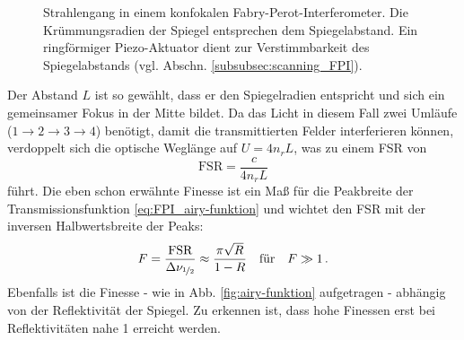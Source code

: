 \begin{figure}[h]
 	\centering
	\caption[FPI - konfokal]{Strahlengang in einem
	konfokalen Fabry-Perot-Interferometer. Die
	Krümmungsradien der Spiegel entsprechen dem
	Spiegelabstand. Ein ringförmiger Piezo-Aktuator dient zur
	Verstimmbarkeit des Spiegelabstands (vgl. Abschn.
	\ref{subsubsec:scanning_FPI}).}\label{fig:FPI_konfokal}
\end{figure}
Der Abstand $L$ ist so gewählt, dass er den Spiegelradien entspricht und sich
ein gemeinsamer Fokus in der Mitte bildet. Da das Licht
in diesem Fall zwei Umläufe ($1\rightarrow2\rightarrow3\rightarrow4$)
benötigt, damit die transmittierten Felder interferieren können,
verdoppelt sich die optische Weglänge auf $U=4n_rL$, was zu einem FSR von
\begin{equation}\label{eq:FPI_FSR_02}
	\text{FSR}=\frac{c}{4n_rL}
\end{equation}
führt. Die eben schon erwähnte Finesse ist ein Maß für die Peakbreite der
Transmissionsfunktion \eqref{eq:FPI_airy-funktion} und wichtet den FSR mit der
inversen Halbwertsbreite der Peaks:
\begin{equation}\label{eq:FPI_finesse}
	F=\frac{\text{FSR}}{\Delta\nu_{\nicefrac{1}{2}}}\approx\frac{\pi\sqrt{R}}{1-R}
	\quad\text{für}\quad F\gg1\,.
\end{equation}
Ebenfalls ist die Finesse - wie in Abb. \ref{fig:airy-funktion} aufgetragen
- abhängig von der Reflektivität der Spiegel. Zu erkennen ist, dass hohe
Finessen erst bei Reflektivitäten nahe 1 erreicht werden.

